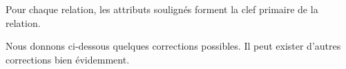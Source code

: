 Pour chaque relation, les attributs soulign\'es forment la clef primaire
de la relation.\\



\begin{correction} 
Nous donnons ci-dessous quelques corrections possibles. Il peut
exister d'autres corrections bien \'evidemment.
\end{correction}

